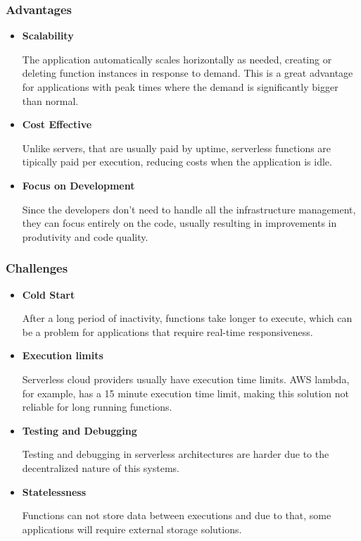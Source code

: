 \subsubsection{Advantages}
\begin{itemize}

	\item \textbf{Scalability}

	      The application automatically scales horizontally as needed, creating or
	      deleting function instances in response to demand. This is a great
	      advantage for applications with peak times where the demand is
	      significantly bigger than normal.

	\item \textbf{Cost Effective}

	      Unlike servers, that are usually paid by uptime, serverless functions are
	      tipically paid per execution, reducing costs when the application is idle.

	\item \textbf{Focus on Development}

	      Since the developers don't need to handle all the infrastructure management,
	      they can focus entirely on the code, usually resulting in improvements in
	      produtivity and code quality.


\end{itemize}

\subsubsection{Challenges}
\begin{itemize}
	\item \textbf{Cold Start}

	      After a long period of inactivity, functions take longer to execute, which
	      can be a problem for applications that require real-time responsiveness.

	\item \textbf{Execution limits}

	      Serverless cloud providers usually have execution time limits. AWS lambda,
	      for example, has a 15 minute execution time limit, making this solution
	      not reliable for long running functions.

	\item \textbf{Testing and Debugging}

	      Testing and debugging in serverless architectures are harder due to the
	      decentralized nature of this systems.

	\item \textbf{Statelessness}

	      Functions can not store data between executions and due to that, some
	      applications will require external storage solutions.
\end{itemize}

